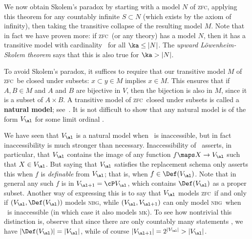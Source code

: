 \documentclass[12pt]{amsart}
\def\zfc{\textsc{zfc}}
\def\nbg{\textsc{nbg}}
\def\mk{\textsc{mk}}
\begin{document}
We now obtain Skolem's paradox by starting with a model $N$ of \zfc,
applying this theorem for any countably infinite $S\subset N$ (which
exists by the axiom of infinity), then taking the transitive collapse
of the resulting model $M$.  Note that in fact we have proven more: if
\zfc\ (or any theory) has a model $N$, then it has a transitive model
with cardinality \ka\ for all $\ka\le|N|$.  The \emph{upward
  L\"owenheim-Skolem theorem} says that this is also true for $\ka
>|N|$.

To avoid Skolem's paradox, it suffices to require that our transitive
model $M$ of \zfc\ be closed under subsets: $x\subset y\in M$ implies
$x\in M$.  This ensures that if $A,B\in M$ and $A$ and $B$ are
bijective in $V$, then the bijection is also in $M$, since it is a
subset of $A\times B$.  A transitive model of \zfc\ closed
under subsets is called a \textbf{natural model}; see~\cite{mv:nmod}.
It is not difficult to show that any natural model is of the form
$V_\al$ for some limit ordinal \al.

We have seen that $V_\al$ is a natural model when \al\ is
inaccessible, but in fact inaccessibility is much stronger than
necessary.  Inaccessibility of \al\ asserts, in particular, that
$V_\al$ contains the image of any function $f\maps X\to V_\al$ such
that $X\in V_\al$.  But saying that $V_\al$ satisfies the replacement
schema only asserts this when $f$ is \emph{definable} from $V_\al$;
that is, when $f\in\Def(V_\al)$.  Note that in general any such $f$ is
in $V_{\al+1}=\cP V_\al$, which contains $\Def(V_\al)$ as a proper
subset.  Another way of expressing this is to say that $V_\al$ models
\zfc\ if and only if $(V_\al,\Def(V_\al))$ models \nbg, while
$(V_\al,V_{\al+1})$ can only model \nbg\ when \al\ is inaccessible (in
which case it also models \mk).  To see how nontrivial this
distinction is, observe that since there are only countably many
statements \ph, we have $|\Def(V_\al)| = |V_\al|$, while of course
$|V_{\al+1}| = 2^{|V_\al|} > |V_\al|$.

\end{document}
